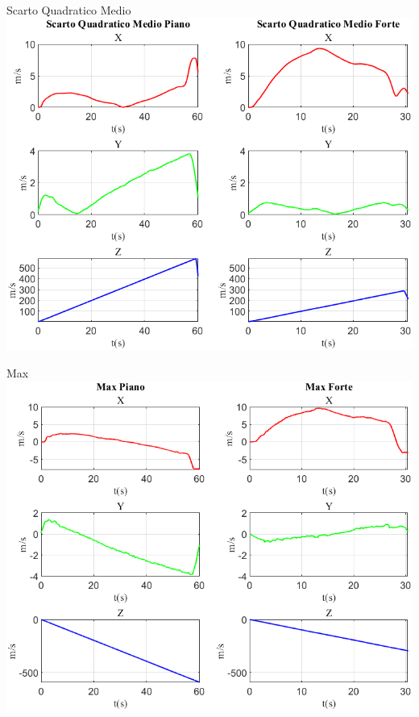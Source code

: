 	\begin{frame}{{Scarto Quadratico Medio}}
		\centering\includegraphics[height=.8\textheight]{figure/Vel/Scarto Quadratico Medio}
	\end{frame}
	
	\begin{frame}{{Max}}
		\centering\includegraphics[height=.8\textheight]{figure/Vel/Max}
	\end{frame}
	
